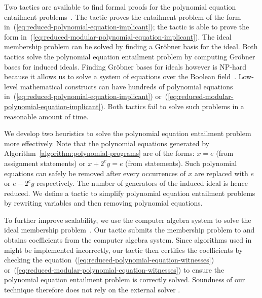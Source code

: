 Two \coq tactics are available to
find formal proofs for the polynomial equation entailment
problems~\cite{P:08:CGBP,P:10:CGBP}. 
The tactic  proves the entailment problem of
the form in~(\ref{eq:reduced-polynomial-equation-implicant}); the
tactic  is able to prove the form
in~(\ref{eq:reduced-modular-polynomial-equation-implicant}). 
The ideal membership problem can be solved by finding a Gr\"obner
basis for the ideal. 
Both tactics solve the polynomial equation entailment problem by
computing Gr\"obner bases for induced ideals. Finding Gr\"obner bases
for ideals however is NP-hard because it allows us to solve a
system of equations over the Boolean field~\cite{GJ:1979:CAI}. 
Low-level mathematical constructs can have
hundreds of polynomial equations 
in~(\ref{eq:reduced-polynomial-equation-implicant})
or~(\ref{eq:reduced-modular-polynomial-equation-implicant}). 
Both \coq tactics fail to solve such problems in a reasonable
amount of time. 

We develop two heuristics to solve the polynomial equation
entailment problem more effectively. Note that the polynomial equations
generated by Algorithm~\ref{algorithm:polynomial-programs} are of the  
forms: $x = e$ (from assignment statements) or $x + 2^c y
= e$ (from  statements). Such polynomial equations can
safely be removed after every occurrences of $x$ are replaced with $e$
or $e - 2^c y$ respectively. The number of generators of the induced
ideal is hence reduced. We define a \coq
tactic to simplify polynomial equation entailment problems by 
rewriting variables and then removing polynomial equations.

To further improve scalability, we use the computer algebra system
\singular to solve the ideal membership problem~\cite{GP:08:SICA}. 
Our tactic submits the membership problem to \singular and 
obtains coefficients from the computer algebra system. 
Since algorithms used in \singular might be implemented incorrectly, 
our \coq
tactic then certifies the coefficients by checking the
equation~(\ref{eq:reduced-polynomial-equation-witnesses})
or~(\ref{eq:reduced-modular-polynomial-equation-witnesses}) to ensure
the polynomial equation entailment problem is correctly
solved. Soundness of our technique therefore does not rely on the
external solver \singular.

